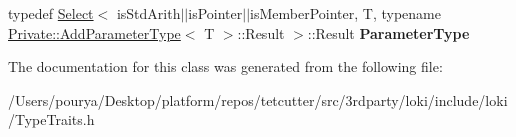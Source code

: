 \begin{DoxyCompactItemize}
\item 
\hypertarget{classLoki_1_1TypeTraits_a9f5d013df6ba95116d60b3da002beb4c}{}typedef \hyperlink{structLoki_1_1Select}{Select}$<$ is\+Std\+Arith$\vert$$\vert$is\+Pointer$\vert$$\vert$is\+Member\+Pointer, T, typename \hyperlink{structLoki_1_1Private_1_1AddParameterType}{Private\+::\+Add\+Parameter\+Type}$<$ T $>$\+::Result $>$\+::Result {\bfseries Parameter\+Type}\label{classLoki_1_1TypeTraits_a9f5d013df6ba95116d60b3da002beb4c}

\end{DoxyCompactItemize}


The documentation for this class was generated from the following file\+:\begin{DoxyCompactItemize}
\item 
/\+Users/pourya/\+Desktop/platform/repos/tetcutter/src/3rdparty/loki/include/loki/Type\+Traits.\+h\end{DoxyCompactItemize}
